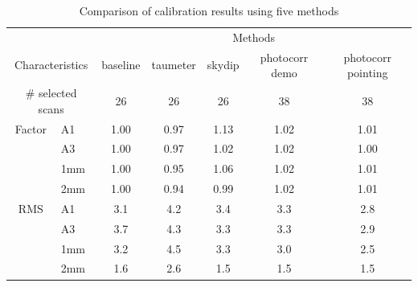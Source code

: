 \begin{table}[th]
\begin{center}
\begin{tabular}{|c|l|c|c|c|c|c|}
  \hline
  \multicolumn{2}{|c|}{}  &  \multicolumn{5}{|c|}{Methods} \\\cline{3-7}
  \multicolumn{2}{|c|}{Characteristics} &  baseline  & taumeter  &  skydip  &  photocorr demo & photocorr pointing \\
  \hline\hline
   \multicolumn{2}{|c|}{$\#$ selected scans} & 26    &       26  &    26    &    38           &    38 \\ 
  \hline 
  Factor &  A1          &   1.00  &  0.97   &  1.13    &   1.02    &   1.01  \\
       &  A3            &   1.00  &  0.97   &  1.02    &   1.02    &   1.00  \\
       &  1mm           &   1.00  &  0.95   &  1.06    &   1.02    &   1.01  \\
       &  2mm           &   1.00  &  0.94   &  0.99    &   1.02    &   1.01  \\
  \hline
  RMS  &  A1            &  3.1    &   4.2   &   3.4    &    3.3    &   2.8 \\
       &  A3            &  3.7    &   4.3   &   3.3    &    3.3    &   2.9 \\
       &  1mm           &  3.2    &   4.5   &   3.3    &    3.0    &   2.5 \\
       &  2mm           &  1.6    &   2.6   &   1.5    &    1.5    &   1.5 \\
\hline\hline
\end{tabular}
\caption[Comparison of calibration results using five methods]{Comparison of calibration results using five methods}
\label{tab:Abs_calibration_results_all}
\end{center}
\end{table}





